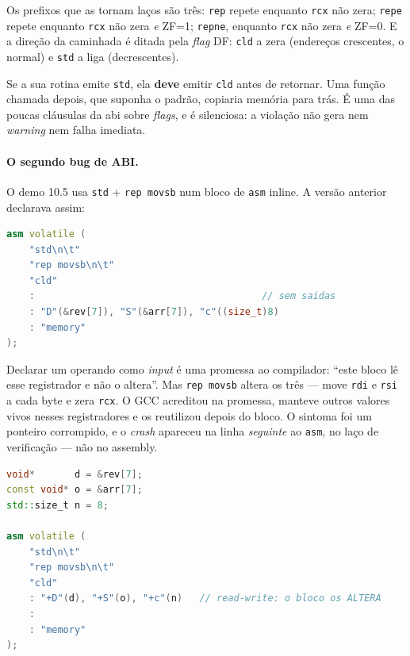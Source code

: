 Os prefixos que as tornam laços são três: \texttt{rep} repete enquanto
\texttt{rcx} não zera; \texttt{repe} repete enquanto \texttt{rcx} não zera
\emph{e} ZF=1; \texttt{repne}, enquanto \texttt{rcx} não zera \emph{e} ZF=0. E a
direção da caminhada é ditada pela \emph{flag} DF: \texttt{cld} a zera
(endereços crescentes, o normal) e \texttt{std} a liga (decrescentes).

\begin{regra}[a ABI garante DF=0 na entrada de toda função --- e cobra a volta]
Se a sua rotina emite \texttt{std}, ela \textbf{deve} emitir \texttt{cld} antes
de retornar. Uma função chamada depois, que suponha o padrão, copiaria memória
para trás. É uma das poucas cláusulas da \gls{abi} sobre \emph{flags}, e é
silenciosa: a violação não gera nem \emph{warning} nem falha imediata.
\end{regra}

\paragraph{O segundo bug de ABI.} O demo 10.5 usa \texttt{std} + \texttt{rep
movsb} num bloco de \texttt{asm} inline. A versão anterior declarava assim:

\begin{lstlisting}[style=bt, language=C++,
    caption={A declaração errada --- os três registradores como \emph{entrada
             pura}.}]
asm volatile (
    "std\n\t"
    "rep movsb\n\t"
    "cld"
    :                                        // sem saidas
    : "D"(&rev[7]), "S"(&arr[7]), "c"((size_t)8)
    : "memory"
);
\end{lstlisting}

Declarar um operando como \emph{input} é uma promessa ao compilador: ``este
bloco lê esse registrador e não o altera''. Mas \texttt{rep movsb} altera os
três --- move \texttt{rdi} e \texttt{rsi} a cada byte e zera \texttt{rcx}. O GCC
acreditou na promessa, manteve outros valores vivos nesses registradores e os
reutilizou depois do bloco. O sintoma foi um ponteiro corrompido, e o
\emph{crash} apareceu na linha \emph{seguinte} ao \texttt{asm}, no laço de
verificação --- não no assembly.

\begin{lstlisting}[style=bt, language=C++,
    caption={A correção, em \texttt{src/asm\_course/10\_string\_ops.cpp}:
             \texttt{"+"} = \emph{read-write}.}]
void*       d = &rev[7];
const void* o = &arr[7];
std::size_t n = 8;

asm volatile (
    "std\n\t"
    "rep movsb\n\t"
    "cld"
    : "+D"(d), "+S"(o), "+c"(n)   // read-write: o bloco os ALTERA
    :
    : "memory"
);
\end{lstlisting}


